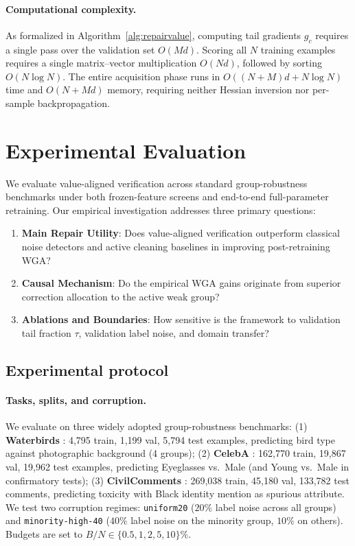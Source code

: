 \documentclass{article}
\begin{document}
\paragraph{Computational complexity.}
As formalized in Algorithm~\ref{alg:repairvalue}, computing tail gradients $g_c$ requires a single pass over the validation set $O(M d)$. Scoring all $N$ training examples requires a single matrix--vector multiplication $O(N d)$, followed by sorting $O(N \log N)$. The entire acquisition phase runs in $O((N+M)d + N \log N)$ time and $O(N + M d)$ memory, requiring neither Hessian inversion nor per-sample backpropagation.

\section{Experimental Evaluation}
\label{sec:results}

We evaluate value-aligned verification across standard group-robustness benchmarks under both frozen-feature screens and end-to-end full-parameter retraining. Our empirical investigation addresses three primary questions:
\begin{enumerate}[leftmargin=1.3em,topsep=1pt,itemsep=0.5pt,parsep=0pt]
  \item \textbf{Main Repair Utility}: Does value-aligned verification outperform classical noise detectors and active cleaning baselines in improving post-retraining WGA?
  \item \textbf{Causal Mechanism}: Do the empirical WGA gains originate from superior correction allocation to the active weak group?
  \item \textbf{Ablations and Boundaries}: How sensitive is the framework to validation tail fraction $\tau$, validation label noise, and domain transfer?
\end{enumerate}

\subsection{Experimental protocol}
\label{sec:protocol}

\paragraph{Tasks, splits, and corruption.}
We evaluate on three widely adopted group-robustness benchmarks:
(1) \textbf{Waterbirds} \citep{sagawa2019distributionally}: 4,795 train, 1,199 val, 5,794 test examples, predicting bird type against photographic background (4 groups);
(2) \textbf{CelebA} \citep{liu2015faceattributes}: 162,770 train, 19,867 val, 19,962 test examples, predicting Eyeglasses vs.\ Male (and Young vs.\ Male in confirmatory tests);
(3) \textbf{CivilComments} \citep{borkan2019nuanced}: 269,038 train, 45,180 val, 133,782 test comments, predicting toxicity with Black identity mention as spurious attribute.
We test two corruption regimes: \texttt{uniform20} ($20\%$ label noise across all groups) and \texttt{minority-high-40} ($40\%$ label noise on the minority group, $10\%$ on others). Budgets are set to $B/N \in \{0.5, 1, 2, 5, 10\}\%$.
\end{document}
